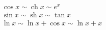 \begin{eqnarray*}
\cos x \sim \mathop{\mathrm{ch }} x \sim e^x \\
\sin x \sim \mathop{\mathrm{sh }} x \sim \tan x \\
\ln x \sim \ln x +\cos x \sim \ln x +x
\end{eqnarray*}